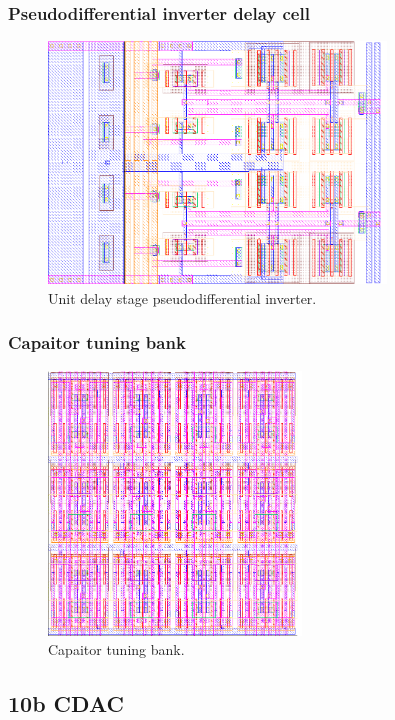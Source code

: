 			\subsubsection{Pseudodifferential inverter delay cell}
				\begin{figure}[htb!]
				        \centering
				        \includegraphics[width=0.8\textwidth, angle=0]{./figs/layout/layout_ro_pseudodiff_inv}
				    \caption{Unit delay stage pseudodifferential inverter.}
				\end{figure}
			\FloatBarrier
			\subsubsection{Capaitor tuning bank}
				\begin{figure}[htb!]
				        \centering
				        \includegraphics[width=0.6\textwidth, angle=0]{./figs/layout/layout_pvt_bank}
				    \caption{Capaitor tuning bank.}
				\end{figure}
		\FloatBarrier\pagebreak
		\subsection{10b CDAC}\label{sec:lay_cdac_10b}
